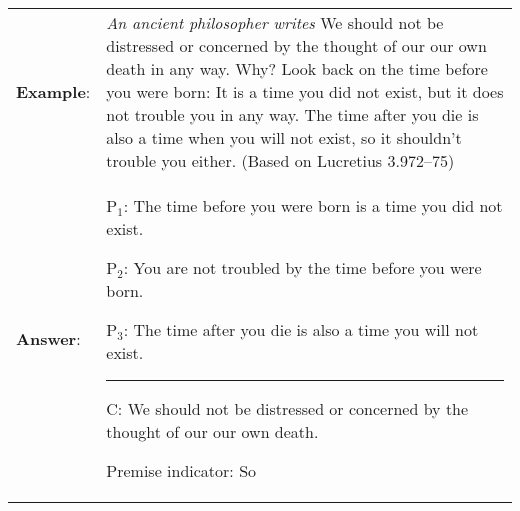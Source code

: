 \begin{longtabu}{p{.1\linewidth}p{.9\linewidth}}	
\textbf{Example}: & \textit{An ancient philosopher writes} We should not be distressed or concerned by the thought of our our own death in any way. Why? Look back on the time before you were born: It is a time you did not exist, but it does not trouble you in any way. The time after you die is also a time when you will not exist, so it shouldn't trouble you either. (Based on Lucretius  3.972--75)\\
\textbf{Answer}: & 
\vspace{-16pt}
\begin{earg}
\item[P$_1$:] The time before you were born is a time you did not exist.
\item[P$_2$:] You are not troubled by the time before you were born. 
\item[P$_3$:] The time after you die is also a time you will not exist.
\vspace{-.5em}
\item [] \rule{0.6\linewidth}{.5pt} 
\item[C:] We should not be distressed or concerned by the thought of our our own death. 
\end{earg} 
Premise indicator: So
\\
\end{longtabu}
	
